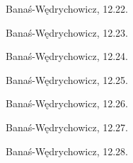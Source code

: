 \begin{integral}
Banaś-Wędrychowicz, 12.22. %
\end{integral}

\begin{integral}
Banaś-Wędrychowicz, 12.23. %
\end{integral}

\begin{integral}
Banaś-Wędrychowicz, 12.24. %
\end{integral}

\begin{integral}
Banaś-Wędrychowicz, 12.25. %
\end{integral}

\begin{integral}
Banaś-Wędrychowicz, 12.26. %
\end{integral}

\begin{integral}
Banaś-Wędrychowicz, 12.27. %
\end{integral}

\begin{integral}
Banaś-Wędrychowicz, 12.28. %
\end{integral}

%